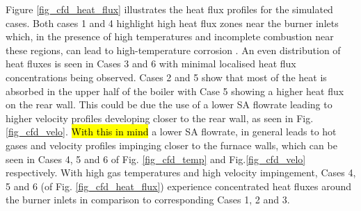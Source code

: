 \documentclass[twocolumn,10pt]{asme2ej}
\begin{document}
\newpage
Figure \ref{fig_cfd_heat_flux} illustrates the heat flux profiles for the simulated cases. Both cases 1 and 4 highlight high heat flux zones near the burner inlets which, in the presence of high temperatures and incomplete combustion near these regions, can lead to high-temperature corrosion \cite{ugum2019}. An even distribution of heat fluxes is seen in Cases 3 and 6 with minimal localised heat flux concentrations being observed. Cases 2 and 5 show that most of the heat is absorbed in the upper half of the boiler with Case 5 showing a higher heat flux on the rear wall. This could be due the use of a lower SA flowrate leading to higher velocity profiles developing closer to the rear wall, as seen in Fig. \ref{fig_cfd_velo}. \hl{With this in mind} a lower SA flowrate, in general leads to hot gases and velocity profiles impinging closer to the furnace walls, which can be seen in Cases 4, 5 and 6 of Fig. \ref{fig_cfd_temp} and Fig.\ref{fig_cfd_velo} respectively. With high gas temperatures and high velocity impingement, Cases 4, 5 and 6 (of Fig. \ref{fig_cfd_heat_flux}) experience concentrated heat fluxes around the burner inlets in comparison to corresponding Cases 1, 2 and 3.\\
\end{document}
